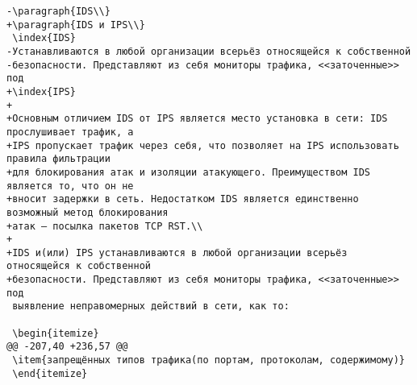 \begin{verbatim}
-\paragraph{IDS\\}
+\paragraph{IDS и IPS\\}
 \index{IDS}
-Устанавливаются в любой организации всерьёз относящейся к собственной
-безопасности. Представляют из себя мониторы трафика, <<заточенные>> под
+\index{IPS}
+
+Основным отличием IDS от IPS является место установка в сети: IDS прослушивает трафик, а
+IPS пропускает трафик через себя, что позволяет на IPS использовать правила фильтрации
+для блокирования атак и изоляции атакующего. Преимуществом IDS является то, что он не
+вносит задержки в сеть. Недостатком IDS является единственно возможный метод блокирования
+атак – посылка пакетов TCP RST.\\
+
+IDS и(или) IPS устанавливаются в любой организации всерьёз относящейся к собственной
+безопасности. Представляют из себя мониторы трафика, <<заточенные>> под
 выявление неправомерных действий в сети, как то:

 \begin{itemize}
@@ -207,40 +236,57 @@
 \item{запрещённых типов трафика(по портам, протоколам, содержимому)}
 \end{itemize}


\end{verbatim}
